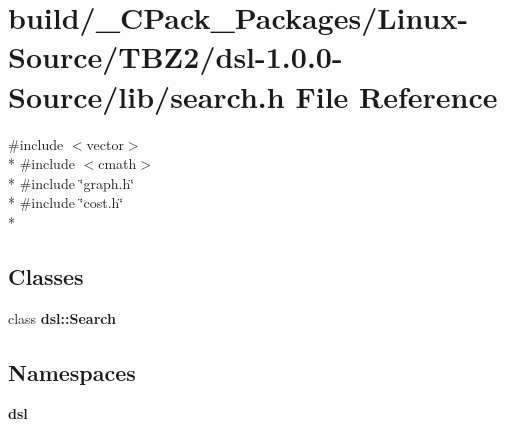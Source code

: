 \section{build/\-\_\-\-C\-Pack\-\_\-\-Packages/\-Linux-\/\-Source/\-T\-B\-Z2/dsl-\/1.0.0-\/\-Source/lib/search.h File Reference}
\label{build_2__CPack__Packages_2Linux-Source_2TBZ2_2dsl-1_80_80-Source_2lib_2search_8h}
{\ttfamily \#include $<$vector$>$}\\*
{\ttfamily \#include $<$cmath$>$}\\*
{\ttfamily \#include \char`\"{}graph.\-h\char`\"{}}\\*
{\ttfamily \#include \char`\"{}cost.\-h\char`\"{}}\\*
\subsection*{Classes}
\begin{DoxyCompactItemize}
\item 
class {\bf dsl\-::\-Search}
\end{DoxyCompactItemize}
\subsection*{Namespaces}
\begin{DoxyCompactItemize}
\item 
{\bf dsl}
\end{DoxyCompactItemize}
